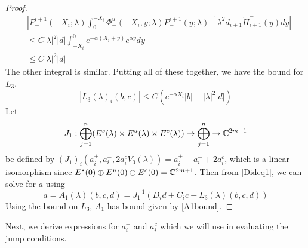 \documentclass[thesis.tex]{subfiles}
\begin{document}
\begin{lemma}
\begin{proof}
\begin{align*}
&\left|
P^{i+1}_-(-X_i; \lambda) \int_0^{-X_i} \Phi^u_-(-X_i, y; \lambda) P^{i+1}_-(y; \lambda)^{-1} \lambda^2 d_{i+1} \tilde{H}_{i+1}^-(y) dy \right| \\
& \leq C |\lambda|^2 |d| \int_{-X_i}^0 e^{-\alpha(X_i + y)} e^{\alpha y} dy \\
& \leq C |\lambda|^2 |d|
\end{align*}
The other integral is similar. Putting all of these together, we have the bound for $L_3$.
\begin{equation}\label{L3bound}
|L_3(\lambda)_i(b, c)| \leq C \left( e^{-\alpha X_i} |b| + |\lambda|^2 |d| \right)
\end{equation}
Let 
\[
J_1: \bigoplus_{j=1}^n (E^s(\lambda) \times E^u(
\lambda) \times E^c(\lambda) ) \rightarrow \bigoplus_{j=1}^n \rightarrow \mathbb{C}^{2m+1}
\]
be defined by $(J_1)_i(a_i^+, a_i^-, 2 a_i^c V_0(\lambda)) = a_i^+ - a_i^- + 2 a_i^c$, which is a linear isomorphism since $E^s(0) \oplus E^u(0) \oplus E^c(0) = \mathbb{C}^{2m+1}$. Then from \cref{Dideq1}, we can solve for $a$ using  
\[
a = A_1(\lambda)(b, c, d) = J_1^{-1} \left(D_i d + C_i c - L_3(\lambda)(b, c, d)\right)
\]
Using the bound on $L_3$, $A_1$ has bound given by \cref{A1bound}.
\end{proof}
\end{lemma}

Next, we derive expressions for $a_i^\pm$ and $a_i^c$ which we will use in evaluating the jump conditions.
\end{document}
